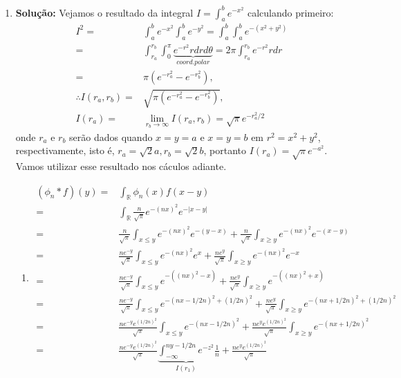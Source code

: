 \documentclass{article}
\begin{document}
\begin{enumerate}
		\item \textbf{Solução:} Vejamos o resultado da integral $I = \int_{a}^{b} e^{-x^{2}}$ calculando primeiro:
		$$
		\begin{aligned}
		I^{2} = & \int_{a}^{b} e^{-x^{2}}\int_{a}^{b} e^{-y^{2}} = \int_{a}^{b} \int_{a}^{b} e^{-(x^{2}+y^{2})} 
		\\
		= & \int_{r_{a}}^{r_{b}} \int_{0}^{\pi} \underbrace{ e^{-r^{2}}r dr d\theta }_{coord. polar} = 2\pi \int_{r_{a}}^{r_{b}} e^{-r^{2}}r dr
		\\
		= & \pi (e^{-r_{a}^{2}} - e^{-r_{b}^{2}}),
		\\
		\therefore I(r_{a}, r_{b}) = & \sqrt{\pi (e^{-r_{a}^{2}} - e^{-r_{b}^{2}})},
		\\
		I(r_{a}) = & \lim_{r_{b} \to \infty} I(r_{a}, r_{b}) = \sqrt{\pi} e^{-r_{a}^{2}/2}
		\end{aligned}
		$$
		onde $r_{a}$ e $r_{b}$ serão dados quando $x=y=a$ e $x=y=b$ em  $r^{2} = x^{2}+y^{2}$, respectivamente, isto é, $r_{a} = \sqrt{2}a, r_{b} = \sqrt{2}b$, portanto $I(r_{a}) = \sqrt{\pi}e^{-a^{2}}$. Vamos utilizar esse resultado nos cáculos adiante.
			\begin{enumerate}
				\item
					$$
					\begin{aligned}
					(\phi_{n}*f)(y) = &\int_{\mathbb{R}} \phi_{n}(x)f(x-y)
					\\
					= &\int_{\mathbb{R}} \frac{n}{\sqrt{\pi}}e^{-(nx)^{2}} e^{-|x-y|}
					\\
					= & \frac{n}{\sqrt{\pi}}\int_{x \leq y} e^{-(nx)^{2}} e^{-(y-x)} + \frac{n}{\sqrt{\pi}}\int_{x \geq y} e^{-(nx)^{2}} e^{-(x-y)}
					\\
					= & \frac{ne^{-y}}{\sqrt{\pi}}\int_{x \leq y} e^{-(nx)^{2}} e^{x} + \frac{ne^{y}}{\sqrt{\pi}}\int_{x \geq y} e^{-(nx)^{2}} e^{-x}
					\\
					= & \frac{ne^{-y}}{\sqrt{\pi}}\int_{x \leq y} e^{-((nx)^{2} -x)}  + \frac{ne^{y}}{\sqrt{\pi}}\int_{x \geq y} e^{-((nx)^{2}+x)}
					\\
					= & \frac{ne^{-y}}{\sqrt{\pi}}\int_{x \leq y} e^{-(nx - 1/2n)^{2} + (1/2n)^{2}} + \frac{ne^{y}}{\sqrt{\pi}}\int_{x \geq y} e^{-(nx + 1/2n)^{2} + (1/2n)^{2}}
					\\
					= & \frac{ne^{-y}e^{ (1/2n)^{2}}}{\sqrt{\pi}}\int_{x \leq y} e^{-(nx - 1/2n)^{2}} + \frac{ne^{y}e^{ (1/2n)^{2}}}{\sqrt{\pi}}\int_{x \geq y} e^{-(nx + 1/2n)^{2}}
					\\
					= & \frac{ne^{-y}e^{(1/2n)^{2}}}{\sqrt{\pi}} \underbrace{ \int_{-\infty}^{ny-1/2n} e^{-z^{2}} }_{I(r_{1})} \frac{1}{n} + \frac{ne^{y}e^{ (1/2n)^{2}}}{\sqrt{\pi}}

\end{aligned}$$
\end{enumerate}
\end{enumerate}
\end{document}
